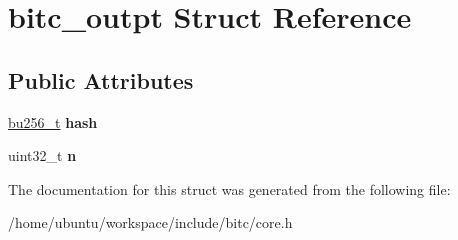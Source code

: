 \hypertarget{structbitc__outpt}{\section{bitc\-\_\-outpt Struct Reference}
\label{structbitc__outpt}
}
\subsection*{Public Attributes}
\begin{DoxyCompactItemize}
\item 
\hypertarget{structbitc__outpt_a0746e24aa0e85249d4f25e0275d97f13}{\hyperlink{structbu256}{bu256\-\_\-t} {\bfseries hash}}\label{structbitc__outpt_a0746e24aa0e85249d4f25e0275d97f13}

\item 
\hypertarget{structbitc__outpt_a265561fa423a4c714e7c5c739d08e0ce}{uint32\-\_\-t {\bfseries n}}\label{structbitc__outpt_a265561fa423a4c714e7c5c739d08e0ce}

\end{DoxyCompactItemize}


The documentation for this struct was generated from the following file\-:\begin{DoxyCompactItemize}
\item 
/home/ubuntu/workspace/include/bitc/core.\-h\end{DoxyCompactItemize}
